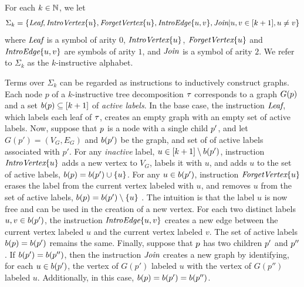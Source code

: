 \begin{definition}\label{def:InstructiveAlphabet}
For each $k \in \mathbb{N}$, we let
\begin{align}\nonumber
    \Sigma_k = \{\texttt{\it{Leaf}}, \texttt{\it{IntroVertex}}\{u\},\texttt{\it{ForgetVertex}}\{u\},
    \texttt{\it{IntroEdge}}\{u,v\},\texttt{\it{Join}} | u,v\in [k+1],u\neq v\}
\end{align}
where $\texttt{\it{Leaf}}$ is a symbol of arity $0$, $\texttt{\it{IntroVertex}}\{u\}$, $\texttt{\it{ForgetVertex}}\{u\}$ and $\texttt{\it{IntroEdge}}\{u,v\}$ are symbols of arity $1$, and $\texttt{\it{Join}}$ is a symbol of arity $2$. We refer to $\Sigma_k$ as the $k$-instructive alphabet.
\end{definition}

Terms over $\Sigma_k$ can be regarded as instructions to inductively construct graphs. Each node $p$ of a $k$-instructive tree decomposition $\tau$ corresponds to a graph $G(p)$ and a set $b(p) \subseteq [k+1]$ of \emph{active labels}. In the base case, the instruction $\texttt{\it{Leaf}}$, which labels each leaf of $\tau$, creates an empty graph with an empty set of active labels. Now, suppose that $p$ is a node with a single child $p'$, and let 
$G(p') = (V_G,E_G)$ and $b(p')$ be the graph, and set of of active labels associated with $p'$. For any \textit{inactive} label, $u \in [k+1]\setminus b(p')$, instruction $\texttt{\it{IntroVertex}}\{u\}$ adds a new vertex to $V_G$, labels it with $u$, and adds $u$ to the set of active labels, $b(p) = b(p') \cup \{u\}$. For any $u \in b(p')$, instruction $\texttt{\it{ForgetVertex}}\{u\}$ erases the label from the current vertex labeled with $u$, and removes $u$ from the set of active labels, $b(p) = b(p') \setminus \{u\}$ . The intuition is that the label $u$ is now free and can be used in the creation of a new vertex. For each two distinct labels $u,v \in b(p')$, the instruction $\texttt{\it{IntroEdge}}\{u,v\}$ creates a new edge between the current vertex labeled $u$ and the current vertex labeled $v$. The set of active labels $b(p) = b(p')$ remains the same. 
Finally, suppose that $p$ has two children $p'$ and $p''$. If $b(p') = b(p'')$, then the instruction $\texttt{\it{Join}}$ creates a new graph by identifying, for each $u \in b(p')$, the vertex of $G(p')$ labeled $u$ with the vertex of $G(p'')$ labeled $u$. Additionally, in this case, $b(p) = b(p') = b(p'')$.


